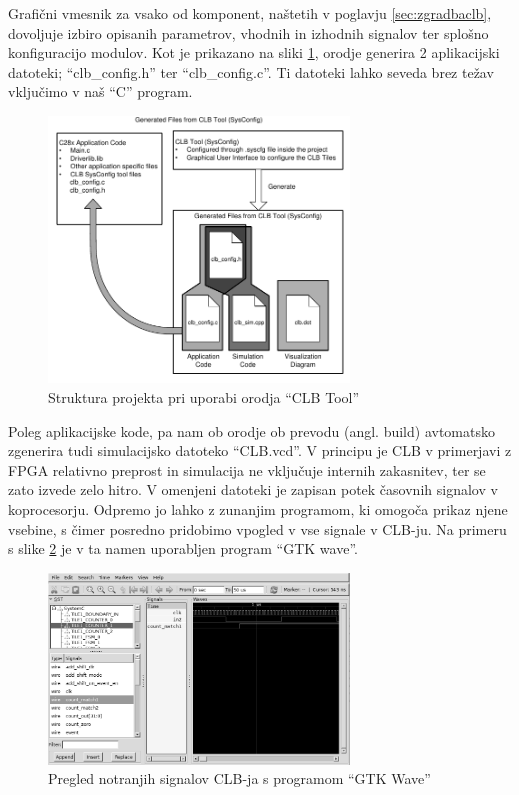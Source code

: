 \documentclass[a4paper]{article}
\begin{document}
\begin{sloppypar}
Grafični vmesnik za vsako od komponent, naštetih v poglavju
\ref{sec:zgradbaclb}, dovoljuje izbiro opisanih parametrov, vhodnih in izhodnih
signalov ter splošno konfiguracijo modulov. Kot je prikazano na sliki
\ref{fig:clbtool_struktura}, orodje generira 2 aplikacijski datoteki;
``clb\_config.h'' ter ``clb\_config.c''. Ti datoteki lahko seveda brez težav
vključimo v naš ``C'' program.

\begin{figure}[htb]
    \centerline{\includegraphics[width=8cm]{clbtool_struktura}}
    \caption{Struktura projekta pri uporabi orodja ``CLB Tool''
             \cite[Pogl.~1]{clb-user-guide}}
    \label{fig:clbtool_struktura} 
\end{figure} 

Poleg aplikacijske kode, pa nam ob orodje ob prevodu (angl. build) avtomatsko
zgenerira tudi simulacijsko datoteko ``CLB.vcd''. V principu je CLB v
primerjavi z FPGA relativno preprost in simulacija ne vključuje internih
zakasnitev, ter se zato izvede zelo hitro. V omenjeni datoteki je zapisan potek
časovnih signalov v koprocesorju. Odpremo jo lahko z zunanjim programom, ki
omogoča prikaz njene vsebine, s čimer posredno pridobimo vpogled v vse signale
v CLB-ju. Na primeru s slike \ref{fig:clbtool_simulacija} je v ta namen
uporabljen program ``GTK wave''.

\begin{figure}[htb]
    \centerline{\includegraphics[width=8cm]{gtkwave}}
    \caption{Pregled notranjih signalov CLB-ja s programom ``GTK Wave''}
    \label{fig:clbtool_simulacija} 
\end{figure} 


\end{sloppypar}
\end{document}
